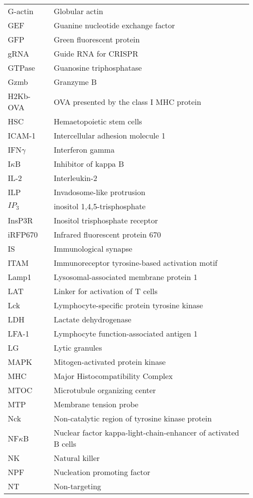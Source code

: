 \documentclass[phd,tocprelim]{cornell}
\begin{document}
\begin{longtable}{ p{} p{} }
	G-actin & Globular actin \\
	GEF & Guanine nucleotide exchange factor \\
	GFP & Green fluorescent protein \\
	gRNA & Guide RNA for CRISPR \\
	GTPase & Guanosine triphosphatase \\
	Gzmb & Granzyme B \\
	H2Kb-OVA & OVA presented by the class I MHC protein \\
	HSC & Hemaetopoietic stem cells \\
	ICAM-1 & Intercellular adhesion molecule 1 \\
	IFN$\gamma$ & Interferon gamma \\
	I$\kappa$B & Inhibitor of kappa B \\
	IL-2 & Interleukin-2 \\
	ILP & Invadosome-like protrusion\\
	$IP_3$ & inositol 1,4,5-trisphosphate \\
	InsP3R & Inositol trisphosphate receptor  \\
	iRFP670 & Infrared fluorescent protein 670 \\
	IS & Immunological synapse \\
	ITAM & Immunoreceptor tyrosine-based activation motif \\
	Lamp1 & Lysosomal-associated membrane protein 1 \\
	LAT & Linker for activation of T cells \\
	Lck & Lymphocyte-specific protein tyrosine kinase \\
	LDH	& Lactate dehydrogenase \\
	LFA-1 & Lymphocyte function-associated antigen 1 \\
	LG & Lytic granules \\
	MAPK & Mitogen-activated protein kinase \\
	MHC & Major Histocompatibility Complex \\
	MTOC & Microtubule organizing center \\
	MTP & Membrane tension probe \\
	Nck & Non-catalytic region of tyrosine kinase protein \\
	NF$\kappa$B & Nuclear factor kappa-light-chain-enhancer of activated B cells \\
	NK & Natural killer \\
	NPF & Nucleation promoting factor \\
	NT & Non-targeting \\

\end{longtable}
\end{document}
